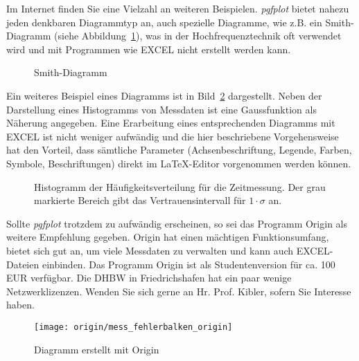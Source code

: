 Im Internet finden Sie eine Vielzahl an weiteren Beispielen. \textit{pgfplot} bietet nahezu jeden denkbaren Diagrammtyp an, auch spezielle Diagramme, wie z.B. ein Smith-Diagramm (siehe Abbildung~\ref{fig:smith}), was in der Hochfrequenztechnik oft verwendet wird und mit Programmen wie EXCEL nicht erstellt werden kann.

\begin{figure}[hbt]
	\centering
\caption[Smith-Diagramm]{Smith-Diagramm}
\label{fig:smith}
\end{figure}

Ein weiteres Beispiel eines Diagramms ist in Bild~\ref{fig:historamm} dargestellt. Neben der Darstellung eines Histogramms von Messdaten ist eine Gaussfunktion als Näherung angegeben. Eine Erarbeitung eines entsprechenden Diagramms mit EXCEL ist nicht weniger aufwändig und die hier beschriebene Vorgehensweise hat den Vorteil, dass sämtliche Parameter (Achsenbeschriftung, Legende, Farben, Symbole, Beschriftungen) direkt im \LaTeX-Editor vorgenommen werden können.

\begin{figure}[hbt]
	\centering
	
	\caption[Histogramm der Häufigkeitsverteilung für eine Zeitmessung]{Histogramm der Häufigkeitsverteilung für die Zeitmessung. Der grau markierte Bereich gibt das Vertrauensintervall für $1 \cdot \sigma $ an.}
	\label{fig:historamm}
\end{figure}

Sollte \textit{pgfplot} trotzdem zu aufwändig erscheinen, so sei das Programm Origin als weitere Empfehlung gegeben. Origin hat einen mächtigen Funktionsumfang, bietet sich gut an, um viele Messdaten zu verwalten und kann auch EXCEL-Dateien einbinden. Das Programm Origin ist als Studentenversion für ca. 100 EUR verfügbar. Die DHBW in Friedrichshafen hat ein paar wenige Netzwerklizenzen. Wenden Sie sich gerne an Hr. Prof. Kibler, sofern Sie Interesse haben.


\begin{figure}[hbt]
	\centering
	\texttt{[image: origin/mess\_fehlerbalken\_origin]}
	\caption{Diagramm erstellt mit Origin}
	\label{fig:origin}
\end{figure}

